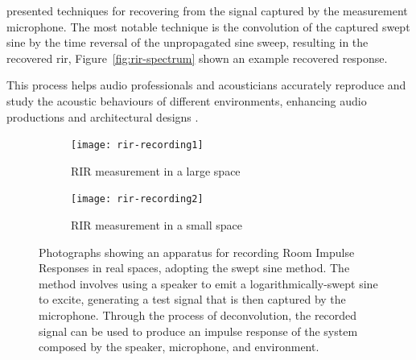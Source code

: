\cite{farina07} presented techniques for recovering  from the signal captured by the measurement microphone. The most notable technique is the convolution of the captured swept sine by the time reversal of the unpropagated sine sweep, resulting in the recovered \acrshort{rir}, Figure~\ref{fig:rir-spectrum} shown an example recovered response.\par
This process helps audio professionals and acousticians accurately reproduce and study the acoustic behaviours of different environments, enhancing audio productions and architectural designs \citep{holters2009impulse}.

\begin{figure}[htbp]
    \centering
    \begin{subfigure}[t]{1\textwidth}
        \centering
        \texttt{[image: rir-recording1]}
        \caption{RIR measurement in a large space}
        \label{fig:rir-recording1}
    \end{subfigure}

    \begin{subfigure}[t]{1\textwidth}
        \centering
        \texttt{[image: rir-recording2]}
        \caption{RIR measurement in a small space}
        \label{fig:rir-recording2}
    \end{subfigure}

       \caption[RIR measurement apparatus]{Photographs showing an apparatus for recording Room Impulse Responses in real spaces, adopting the swept sine method. The method involves using a speaker to emit a logarithmically-swept sine to excite, generating a test signal that is then captured by the microphone. Through the process of deconvolution, the recorded signal can be used to produce an impulse response of the system composed by the speaker, microphone, and environment.}
       \label{fig:rir-recording-examples}
\end{figure}


